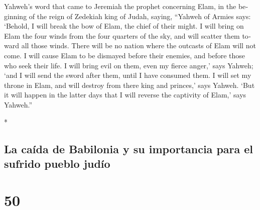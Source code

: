 \begin{paracol}{2}
\begin{otherlanguage}{english}
 Yahweh's word that came to Jeremiah the prophet
concerning Elam, in the beginning of the reign of Zedekiah king of
Judah, saying,  ``Yahweh of Armies says: `Behold, I will
break the bow of Elam, the chief of their might.  I will
bring on Elam the four winds from the four quarters of the sky, and will
scatter them toward all those winds. There will be no nation where the
outcasts of Elam will not come.  I will cause Elam to be
dismayed before their enemies, and before those who seek their life. I
will bring evil on them, even my fierce anger,' says Yahweh; `and I will
send the sword after them, until I have consumed them.  I
will set my throne in Elam, and will destroy from there king and
princes,' says Yahweh.  `But it will happen in the latter
days that I will reverse the captivity of Elam,' says Yahweh.''

\end{otherlanguage}

\switchcolumn[0]*

\hypertarget{la-cauxedda-de-babilonia-y-su-importancia-para-el-sufrido-pueblo-juduxedo}{%
\subsection{La caída de Babilonia y su importancia para el sufrido
pueblo
judío}\label{la-cauxedda-de-babilonia-y-su-importancia-para-el-sufrido-pueblo-juduxedo}}

\hypertarget{section-98}{%
\section{50}\label{section-98}}


\end{paracol}
